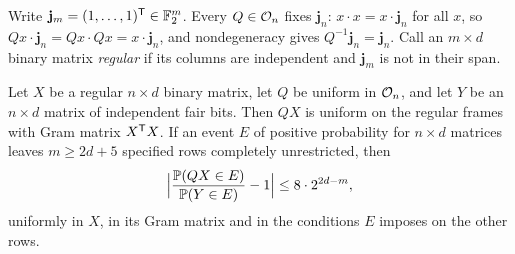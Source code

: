 Write $\mathbf j_m=(1,\dots,1)^{\mathsf{T}}\in\mathbb{F}_2^m$. Every $Q\in\mathcal{O}_n$ fixes $\mathbf j_n$:
$x\cdot x=x\cdot\mathbf j_n$ for all $x$, so $Qx\cdot\mathbf j_n=Qx\cdot Qx=x\cdot\mathbf j_n$,
and nondegeneracy gives $Q^{-1}\mathbf j_n=\mathbf j_n$. Call an $m\times d$ binary matrix
\emph{regular} if its columns are independent and $\mathbf j_m$ is not in their span.

\begin{lemma}\label{spn:lem:fibre}
Let $X$ be a regular $n\times d$ binary matrix, let $Q$ be uniform in $\mathcal{O}_n$, and let
$Y$ be an $n\times d$ matrix of independent fair bits. Then $QX$ is uniform on the regular
frames with Gram matrix $X^{\mathsf{T}}X$. If an event $E$ of positive probability for $n\times d$
matrices leaves $m\ge2d+5$ specified rows completely unrestricted, then
\[
 \Bigl|\frac{\mathbb{P}(QX\in E)}{\mathbb{P}(Y\in E)}-1\Bigr|\le8\cdot2^{2d-m},
\]
uniformly in $X$, in its Gram matrix and in the conditions $E$ imposes on the other rows.
\end{lemma}

